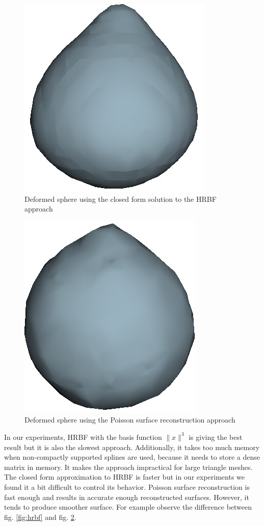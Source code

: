 \documentclass[ams]{U-AizuGT}
\begin{document}
\begin{figure}
  \centering\includegraphics[width=0.7\columnwidth]{deformed_sphere_hrbfclosed-3.jpg}
  \caption{Deformed sphere using the closed form solution to the HRBF approach} \label{fig:closed}
\end{figure}

\begin{figure}
  \centering\includegraphics[width=0.7\columnwidth]{deformed_sphere_poisson.jpg}
  \caption{Deformed sphere using the Poisson surface reconstruction approach} \label{fig:Poisson}
\end{figure}

In our experiments, HRBF with the basis function $\|x\|^3$ is giving the best result 
but it is also the slowest approach. 
Additionally, it takes too much memory when non-compactly supported splines are used, 
because it needs to store a dense matrix in memory.
It makes the approach impractical for large triangle meshes. 
The closed form approximation to HRBF is faster but in our experiments 
we found it a bit difficult to control its behavior.
Poisson surface reconstruction is fast enough and results in accurate enough reconstructed surfaces. 
However, it tends to produce smoother surface. For example observe the difference between
fig. \ref{fig:hrbf} and fig. \ref{fig:Poisson}.
\end{document}
